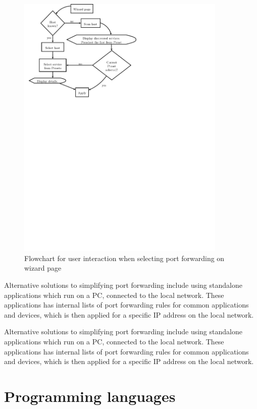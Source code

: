 \documentclass[g5paper,11pt]{kth-bcs}
\begin{document}
\begin{figure}[h]
   \centering
   \includegraphics[trim = 0mm 174mm 80mm 0mm, clip, width=10cm]{after}
   \caption{Flowchart for user interaction when selecting port forwarding on wizard page}
   \label{fig:after}
\end{figure}

Alternative solutions to simplifying port forwarding include using standalone applications which run on a PC, connected to the local network.
These applications has internal lists of port forwarding rules for common applications and devices, which is then applied for a specific IP address on the local network.
\cite{portforward.com}

Alternative solutions to simplifying port forwarding include using standalone applications which run on a PC, connected to the local network.
These applications has internal lists of port forwarding rules for common applications and devices, which is then applied for a specific IP address on the local network.
\cite{portforward.com}

\section{Programming languages}
\end{document}
